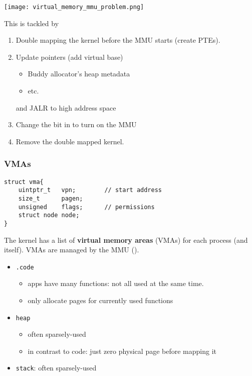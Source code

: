 \begin{center}
    \texttt{[image: virtual\_memory\_mmu\_problem.png]}
\end{center}

This is tackled by
\begin{enumerate}
    \item Double mapping the kernel before the MMU starts (create PTEs).
    \item Update pointers (add virtual base)
          \begin{itemize}
              \item Buddy allocator's heap metadata
              \item {} etc.\
          \end{itemize}
          and JALR to high address space
    \item Change the  bit in   to turn on the MMU
    \item Remove the double mapped kernel.
\end{enumerate}

\subsubsection{VMAs}
\ptitle{Data Structure}
\begin{lstlisting}[style=bright_C++]
struct vma{
    uintptr_t   vpn;        // start address
    size_t      pagen;
    unsigned    flags;      // permissions
    struct node node;
}
\end{lstlisting}

The kernel has a list of \textbf{virtual memory areas} (VMAs) for each process (and itself). VMAs are managed by the MMU ().


\newpar{}
\begin{itemize}
    \item \texttt{.code}
          \begin{itemize}
              \item apps have many functions: not all used at the same time.
              \item only allocate pages for currently used functions
          \end{itemize}
    \item \texttt{heap}
          \begin{itemize}
              \item often sparsely-used
              \item in contrast to code: just zero physical page before mapping it
          \end{itemize}
    \item \texttt{stack}: often sparsely-used
\end{itemize}

